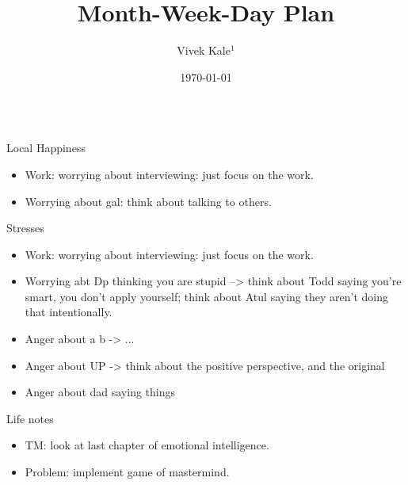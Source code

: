 \documentclass[serif, mathserif, final]{beamer}
\title{Month-Week-Day Plan}\author{Vivek Kale$^1$}\institute{$^1$ University of Illinois at Urbana-Champaign}\date{\today}
\begin{document}
\begin{frame}
  \begin{columns}
    \begin{column}{0.25\linewidth} %
      \begin{block}{Local Happiness}
        \begin{itemize}
          \tiny \item \tiny Work: worrying about interviewing: just focus on the work. 
        \item \tiny Worrying about gal: think about talking to others. 
        \end{itemize}
      \end{block}
      \begin{block}{Stresses}
        \begin{itemize}
          \tiny \item \tiny Work: worrying about interviewing: just focus on the work. 
        \item \tiny Worrying abt Dp thinking you are stupid -->  think
            about Todd saying you're smart, you don't apply yourself; 
            think about Atul saying they aren't doing that
            intentionally. 
          \item \tiny Anger about a b  -> ...
          \item \tiny Anger about UP -> think about the positive
            perspective, and the original
          \item \tiny Anger about dad saying things 
        \end{itemize}
      \end{block}    
      \begin{block}{Life notes}
        \begin{itemize}
        \item \tiny TM: look at last chapter of emotional
          intelligence.  
        \item \tiny Problem: implement game of mastermind. 
        \end{itemize}
      \end{block}
    \end{column} %


\end{columns}
\end{frame}
\end{document}
